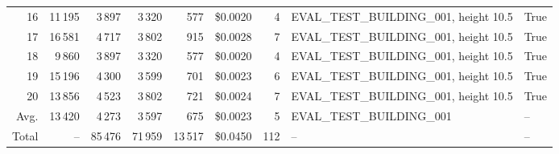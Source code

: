 \documentclass[a4paper,11pt]{article}
\begin{document}
\begin{table}[ht]
\begin{tabular}{r r r r r r r p{3cm} l}
16 & 11\,195 & 3\,897 & 3\,320 & 577 & \$0.0020 & 4 & EVAL\_TEST\_BUILDING\_001, height 10.5 & True \\
17 & 16\,581 & 4\,717 & 3\,802 & 915 & \$0.0028 & 7 & EVAL\_TEST\_BUILDING\_001, height 10.5 & True \\
18 & 9\,860 & 3\,897 & 3\,320 & 577 & \$0.0020 & 4 & EVAL\_TEST\_BUILDING\_001, height 10.5 & True \\
19 & 15\,196 & 4\,300 & 3\,599 & 701 & \$0.0023 & 6 & EVAL\_TEST\_BUILDING\_001, height 10.5 & True \\
20 & 13\,856 & 4\,523 & 3\,802 & 721 & \$0.0024 & 7 & EVAL\_TEST\_BUILDING\_001, height 10.5 & True \\
\hline
Avg. & 13\,420 & 4\,273 & 3\,597 & 675 & \$0.0023 & 5 & EVAL\_TEST\_BUILDING\_001 & -- \\
Total & -- & 85\,476 & 71\,959 & 13\,517 & \$0.0450 & 112 & -- & -- \\
\hline
\end{tabular}
\end{table}

\clearpage
\end{document}
